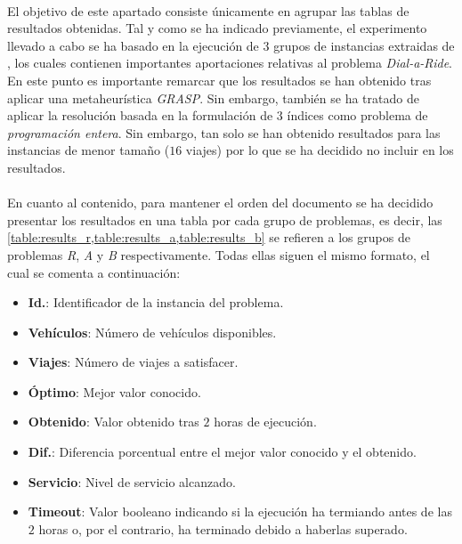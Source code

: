 \documentclass{subfiles}
\begin{document}
        \paragraph{}
        El objetivo de este apartado consiste únicamente en agrupar las tablas de resultados obtenidas. Tal y como se ha indicado previamente, el experimento llevado a cabo se ha basado en la ejecución de $3$ grupos de instancias extraidas de \cite{cordeau2003tabu,ropke2007models}, los cuales contienen importantes aportaciones relativas al problema \emph{Dial-a-Ride}. En este punto es importante remarcar que los resultados se han obtenido tras aplicar una metaheurística \emph{GRASP}. Sin embargo, también se ha tratado de aplicar la resolución basada en la formulación de $3$ índices como problema de \emph{programación entera}. Sin embargo, tan solo se han obtenido resultados para las instancias de menor tamaño ($16$ viajes) por lo que se ha decidido no incluir en los resultados.

        \paragraph{}
        En cuanto al contenido, para mantener el orden del documento se ha decidido presentar los resultados en una tabla por cada grupo de problemas, es decir, las \cref{table:results_r,table:results_a,table:results_b} se refieren a los grupos de problemas \emph{R}, \emph{A} y \emph{B} respectivamente. Todas ellas siguen el mismo formato, el cual se comenta a continuación:

        \begin{itemize}
          \item \textbf{Id.}: Identificador de la instancia del problema.
          \item \textbf{Vehículos}: Número de vehículos disponibles.
          \item \textbf{Viajes}: Número de viajes a satisfacer.
          \item \textbf{Óptimo}: Mejor valor conocido.
          \item \textbf{Obtenido}: Valor obtenido tras $2$ horas de ejecución.
          \item \textbf{Dif.}: Diferencia porcentual entre el mejor valor conocido y el obtenido.
          \item \textbf{Servicio}: Nivel de servicio alcanzado.
          \item \textbf{Timeout}: Valor booleano indicando si la ejecución ha termiando antes de las $2$ horas o, por el contrario, ha terminado debido a haberlas superado.
        \end{itemize}
\end{document}
